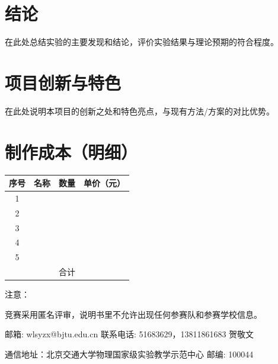 \section{结论}

在此处总结实验的主要发现和结论，评价实验结果与理论预期的符合程度。

\section{项目创新与特色}

在此处说明本项目的创新之处和特色亮点，与现有方法/方案的对比优势。

\section{制作成本（明细）}

\begin{tabular}{|c|c|c|c|}
    \hline
    序号 & 名称 & 数量 & 单价（元） \\
    \hline
    1 &  &  &  \\
    \hline
    2 &  &  &  \\
    \hline
    3 &  &  &  \\
    \hline
    4 &  &  &  \\
    \hline
    5 &  &  &  \\
    \hline
    \multicolumn{3}{|r|}{合计} &  \\
    \hline
\end{tabular}

\vspace{1cm}

{\heiti 注意：}

竞赛采用匿名评审，说明书里不允许出现任何参赛队和参赛学校信息。

\vspace{0.5cm}

\begin{center}
    {\songti{}
    邮箱: wlsyzx@bjtu.edu.cn \quad 联系电话: 51683629，13811861683 贺敬文

    通信地址：北京交通大学物理国家级实验教学示范中心 \quad 邮编: 100044
    }
\end{center}
